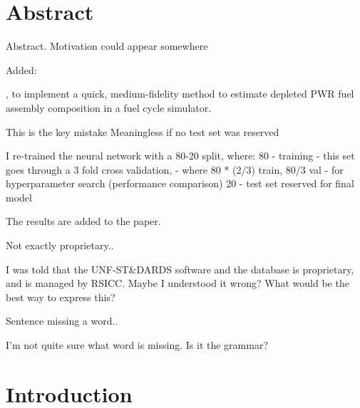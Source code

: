 \documentclass[answers,11pt]{exam}
\begin{document}
\section*{Abstract}
\begin{questions}

        \question Abstract. Motivation could appear somewhere

        \begin{solution}
        	Added:
            
            , to implement a quick, medium-fidelity method to
            estimate depleted \gls{PWR} fuel assembly composition in a fuel
            cycle simulator.
        \end{solution}

        \question
        This is the key mistake Meaningless if no test set was reserved

        \begin{solution}
         I re-trained the neural network with a 80-20 split, where:
         80 - training
            - this set goes through a 3 fold cross validation,
            - where 80 * (2/3) train, 80/3 val
            - for hyperparameter search (performance comparison)
         20 - test set reserved for final model

         The results are added to the paper. 

        \end{solution}

        \quesiton
        Not exactly proprietary..

        \begin{solution}
        I was told that the UNF-ST\&DARDS software and the database is
        proprietary, and is managed by RSICC. Maybe I understood it wrong?
        What would be the best way to express this?
        \end{solution}

        \question
        Sentence missing a word..


        \begin{solution}
        I'm not quite sure what word is missing. Is it the grammar?
        \end{solution}

\section*{Introduction}


\end{questions}
\end{document}
